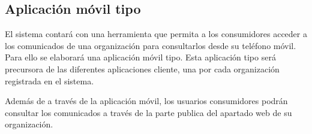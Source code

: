 \subsection{Aplicación móvil tipo}
El sistema contará con una herramienta que permita a los consumidores acceder a los comunicados de una organización para consultarlos desde su teléfono móvil. Para ello se elaborará una aplicación móvil tipo. Esta aplicación tipo será precursora de las diferentes aplicaciones cliente, una por cada organización registrada en el sistema.

Además de a través de la aplicación móvil, los usuarios consumidores podrán consultar los comunicados a través de la parte publica del apartado web de su organización.